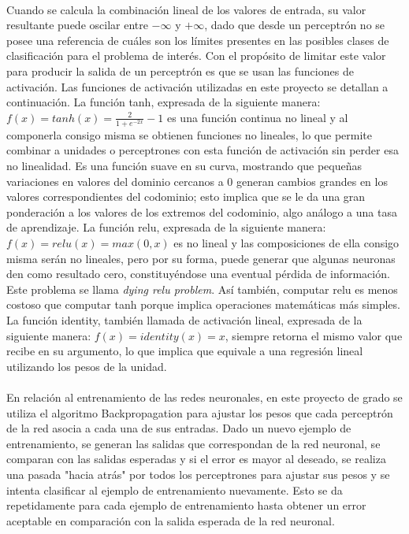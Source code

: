 \paragraph{}Cuando se calcula la combinación lineal de los valores de entrada, su valor resultante puede oscilar entre $-\infty$ y $+\infty$, dado que desde un perceptrón no se posee una referencia de cuáles son los límites presentes en las posibles clases de clasificación para el problema de interés. Con el propósito de limitar este valor para producir la salida de un perceptrón es que se usan las funciones de activación. Las funciones de activación utilizadas en este proyecto se detallan a continuación.
La función tanh, expresada de la siguiente manera: $f(x) = tanh(x) = \frac{2}{1 + e^{-2x}} - 1 $ es una función continua no lineal y al componerla consigo misma se obtienen funciones no lineales, lo que permite combinar a unidades o perceptrones con esta función de activación sin perder esa no linealidad. Es una función suave en su curva, mostrando que pequeñas variaciones en valores del dominio cercanos a 0 generan cambios grandes en los valores correspondientes del codominio; esto implica que se le da una gran ponderación a los valores de los extremos del codominio, algo análogo a una tasa de aprendizaje.
La función relu, expresada de la siguiente manera: $f(x) = relu(x) = max(0, x)$ es no lineal y las composiciones de ella consigo misma serán no lineales, pero por su forma, puede generar que algunas neuronas den como resultado cero, constituyéndose una eventual pérdida de información.
Este problema se llama \textit{dying relu problem}. Así también, computar relu es menos costoso que computar tanh porque implica operaciones matemáticas más simples.
La función identity, también llamada de activación lineal, expresada de la siguiente manera: $f(x) = identity(x) = x$, siempre retorna el mismo valor que recibe en su argumento, lo que implica que equivale a una regresión lineal utilizando los pesos de la unidad.

\paragraph{}En relación al entrenamiento de las redes neuronales, en este proyecto de grado se utiliza el algoritmo Backpropagation para ajustar los pesos que cada perceptrón de la red asocia a cada una de sus entradas. Dado un nuevo ejemplo de entrenamiento, se generan las salidas que correspondan de la red neuronal, se comparan con las salidas esperadas y si el error es mayor al deseado, se realiza una pasada "hacia atrás" por todos los perceptrones para ajustar sus pesos y se intenta clasificar al ejemplo de entrenamiento nuevamente. Esto se da repetidamente para cada ejemplo de entrenamiento hasta obtener un error aceptable en comparación con la salida esperada de la red neuronal.


